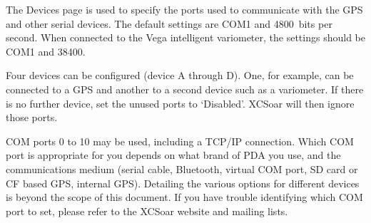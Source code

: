The Devices page is used to specify the ports used to communicate with
the GPS and other serial devices. The default settings are COM1 and
4800~bits per second.  When connected to the Vega intelligent
variometer, the settings should be COM1 and 38400.

Four devices can be configured (device A through D). One, for
example, can be connected to a GPS and another to a
second device such as a variometer.  If there is no further device, 
set the unused ports to `Disabled'.  XCSoar will then ignore those ports.

COM ports 0 to 10 may be used, including a TCP/IP connection.  
Which COM port is appropriate for you
depends on what brand of PDA you use, and the communications medium
(serial cable, Bluetooth, virtual COM port, SD card or CF based GPS,
internal GPS).  Detailing the various options for different devices is
beyond the scope of this document.  If you have trouble identifying
which COM port to set, please refer to the XCSoar website and mailing
lists.

